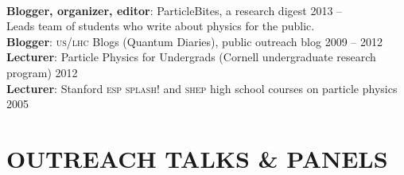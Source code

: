 \documentclass[margin,line]{resume}
\newcommand{\scap}[1]{\textsc{\MakeLowercase{#1}}}
\begin{document}
\begin{resume}
\\
%
\textbf{Blogger, organizer, editor}: ParticleBites, a research digest 
\hfill {2013 -- \phantom{2016}}
\vspace{-.75mm} \\
\phantom{..} {\small Leads team of students who write about physics for the public.}
\\
%
\textbf{Blogger}: \scap{US/LHC} Blogs (Quantum Diaries), public outreach blog \hfill {2009 -- 2012}\\
\textbf{Lecturer}: Particle Physics for Undergrads (Cornell undergraduate research program) \hfill {2012}\\
\textbf{Lecturer}: Stanford \scap{ESP} \scap{SPLASH!} and \scap{SHEP} high school courses on particle physics \hfill {2005}%


\section{\footnotesize \sc
\sffamily 
{}OUTREACH TALKS \& PANELS
}


\end{resume}
\end{document}

